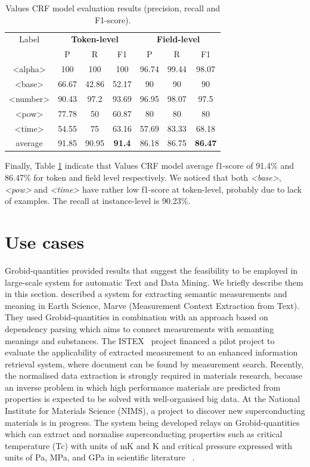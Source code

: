 \documentclass[sigconf]{acmart}
\begin{document}
\begin{table}[ht]
  \caption{Values CRF model evaluation results (precision, recall and F1-score).}
  \label{tab:values-evaluation}
  \begin{tabular}{c|ccc|ccc}
    \toprule
    Label & \multicolumn{3}{c}{\textbf{Token-level}} & \multicolumn{3}{c}{\textbf{Field-level}}\\
    & P & R & F1 & P & R & F1 \\
    \midrule
    <alpha>       & 100   & 100   & 100   & 96.74 & 99.44 & 98.07   \\
    <base>        & 66.67 & 42.86 & 52.17 & 90    & 90    & 90      \\
    <number>      & 90.43 & 97.2  & 93.69 & 96.95 & 98.07 & 97.5    \\
    <pow>         & 77.78 & 50    & 60.87 & 80    & 80    & 80      \\
    <time>        & 54.55 & 75    & 63.16 & 57.69 & 83.33 & 68.18   \\
    \midrule
    average       & 91.85 & 90.95 & \textbf{91.4} & 86.18 & 86.75 & \textbf{86.47}   \\
    \bottomrule
     \end{tabular}
\end{table}

Finally, Table \ref{tab:values-evaluation} indicate that Values CRF model average f1-score of 91.4\% and 86.47\% for token and field level respectively. We noticed that both \textit{<base>}, \textit{<pow>} and \textit{<time>} have rather low f1-score at token-level, probably due to lack of examples. The recall at instance-level is 90.23\%.  

\section{Use cases}
\label{sec:use_cases}
Grobid-quantities provided results that suggest the feasibility to be employed in large-scale system for automatic Text and Data Mining. We briefly describe them in this section.  
\cite{hundman2017measurement} described a system for extracting semantic measurements and meaning in Earth Science, Marve (Measurement Context Extraction from Text). They used Grobid-quantities in combination with an approach based on dependency parsing which aims to connect measurements with semanting meanings and substances. The ISTEX~\cite{dazy2014istex} project financed a pilot project to evaluate the applicability of extracted measurement to an enhanced information retrieval system, where document can be found by measurement search. 
Recently, the normalised data extraction is strongly required in materials research, because an inverse problem in which high performance materials are predicted from properties is expected to be solved with well-organised big data. At the National Institute for Materials Science (NIMS), a project to discover new superconducting materials is in progress. The system being developed relays on Grobid-quantities which can extract and normalise superconducting properties such as critical temperature (Tc) with units of mK and K and critical pressure expressed with units of Pa, MPa, and GPa in scientific literature ~\cite{foppiano2019proposal}. 
\end{document}
